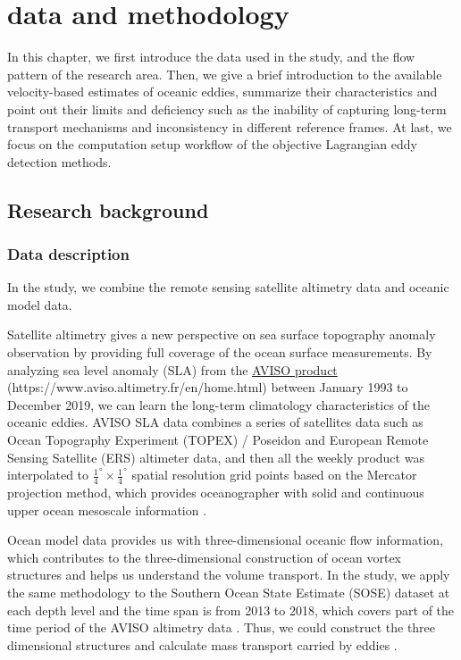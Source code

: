 \chapter{data and methodology}\label{data and methodology}

In this chapter, we first introduce the data used in the study, and the flow pattern of the research area. Then, we give a brief introduction to the available velocity-based estimates of oceanic eddies, summarize their characteristics and point out their limits and deficiency such as the inability of capturing long-term transport mechanisms and inconsistency in different reference frames. At last, we focus on the computation setup workflow of the objective Lagrangian eddy detection methods.


\section{Research background}

\subsection{Data description}

In the study, we combine the remote sensing satellite altimetry data and oceanic model data.

Satellite altimetry gives a new perspective on sea surface topography anomaly observation by providing full coverage of the ocean surface measurements. By analyzing sea level anomaly (SLA) from the \href{https://www.aviso.altimetry.fr/en/home.html}{AVISO product} (https://www.aviso.altimetry.fr/en/home.html) between January 1993 to December 2019, we can learn the long-term climatology characteristics of the oceanic eddies. AVISO SLA data combines a series of satellites data such as Ocean Topography Experiment
(TOPEX) / Poseidon and European Remote Sensing Satellite (ERS) altimeter data, and then all the weekly product was interpolated to $\frac{1}{4}^{\circ} \times \frac{1}{4}^{\circ}$ spatial resolution grid points based on the Mercator projection method, which provides oceanographer with solid and continuous upper ocean mesoscale information \cite{beron2018enduring,ducet2000global,xu2019oceanic,laxenaire2018anticyclonic}.

Ocean model data provides us with three-dimensional oceanic flow information, which contributes to the three-dimensional construction of ocean vortex structures and helps us understand the volume transport. In the study, we apply the same methodology to the Southern Ocean State Estimate (SOSE) dataset at each depth level and the time span is from 2013 to 2018, which covers part of the time period of the AVISO altimetry data \cite{mazloff2010eddy,verdy2017data}. Thus, we could construct the three dimensional structures and calculate  mass transport carried by eddies \cite{dong2012three}.

